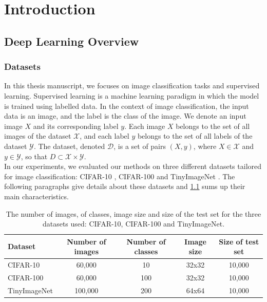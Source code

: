 \chapter{Introduction}\label{chap:intro}
\section{Deep Learning Overview}

\subsection{Datasets}\label{sec:intro:datasets}

In this thesis manuscript, we focuses on image classification tasks and
supervised learning. Supervised learning is a machine learning paradigm in which
the model is trained using labelled data. In the context of image
classification, the input data is an image, and the label is the class of the
image. We denote an input image $X$ and its corresponding label $y$. Each image
$X$ belongs to the set of all images of the dataset $\mathcal{X}$, and each
label $y$ belongs to the set of all labels of the dataset $\mathcal{Y}$. The
dataset, denoted $\mathcal{D}$, is a set of pairs $(X, y)$, where $X \in
\mathcal{X}$ and $y \in \mathcal{Y}$, so that $D \subset \mathcal{X} \times
\mathcal{Y}$. \\

In our experiments, we evaluated our methods on three different datasets
tailored for image classification: CIFAR-10 \cite{CIFARdataset}, CIFAR-100
\cite{CIFARdataset} and TinyImageNet \cite{TinyImageNet}. The following
paragraphs give details about these datasets and \cref{tab:intro:datasets} sums
up their main characteristics.\\

\begin{table}[ht!]
    \centering
    \begin{tabular}{lcccc}
      \toprule
      \textbf{Dataset}    & \textbf{Number of images} & \textbf{Number of classes} &
      \textbf{Image size} & \textbf{Size of test set}                                               \\
      \hline
      CIFAR-10             & 60,000                    & 10                         & 32x32 & 10,000 \\
      CIFAR-100            & 60,000                    & 100                        & 32x32 & 10,000 \\
      TinyImageNet        & 100,000                   & 200                        & 64x64 & 10,000 \\
      \bottomrule
    \end{tabular}
    \caption{The number of images, of classes, image size and size of the test
    set for the three datasets used: CIFAR-10, CIFAR-100 and TinyImageNet.}
    \label{tab:intro:datasets}
  \end{table}

